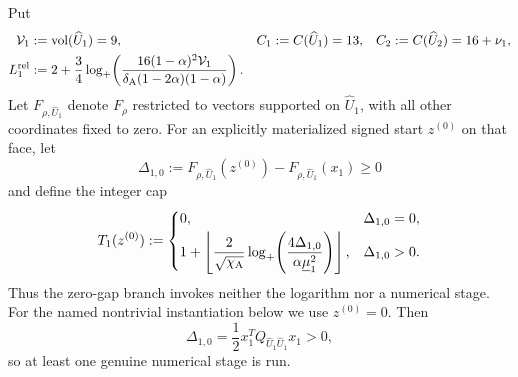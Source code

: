 Put
\begin{align}
 \mathcal V_1&:=\operatorname{vol}(\widehat U_1)=9,
 &C_1&:=C(\widehat U_1)=13,
 &C_2&:=C(\widehat U_2)=16+\nu_1,
 \notag\\
 L_1^{\rm rel}
 &:=2+\frac34\log_+\!\left(
  \frac{16(1-\alpha)^2\mathcal V_1}
       {\delta_{\rm A}(1-2\alpha)(1-\alpha)}
                         \right).
 \label{eq:branch-caterpillar-first-layer-numerical-oracle-log}
\end{align}
Let $F_{\rho,\widehat U_1}$ denote $F_\rho$ restricted to vectors supported
on $\widehat U_1$, with all other coordinates fixed to zero.  For an
explicitly materialized signed start $z^{(0)}$ on that face, let
\begin{equation}
 \Delta_{1,0}:=
 F_{\rho,\widehat U_1}(z^{(0)})
 -F_{\rho,\widehat U_1}(x_1)\geq0
 \label{eq:branch-caterpillar-first-layer-initial-gap}
\end{equation}
and define the integer cap
\begin{equation}
 T_1(z^{(0)}):=
 \begin{cases}
  0,&\Delta_{1,0}=0,\\[2pt]
  1+\left\lfloor
   \dfrac{2}{\sqrt{\chi_{\rm A}}}
   \log_+\!\left(
    \dfrac{4\Delta_{1,0}}
          {\alpha\underline\mu_1^2}
               \right)
     \right\rfloor,&\Delta_{1,0}>0.
 \end{cases}
 \label{eq:branch-caterpillar-first-layer-numerical-stage-cap}
\end{equation}
Thus the zero-gap branch invokes neither the logarithm nor a numerical stage.
For the named nontrivial instantiation below we use $z^{(0)}=0$.  Then
\begin{equation}
 \Delta_{1,0}
 =\frac12 x_1^TQ_{\widehat U_1\widehat U_1}x_1>0,
 \label{eq:branch-caterpillar-first-layer-zero-start-gap}
\end{equation}
so at least one genuine numerical stage is run.

